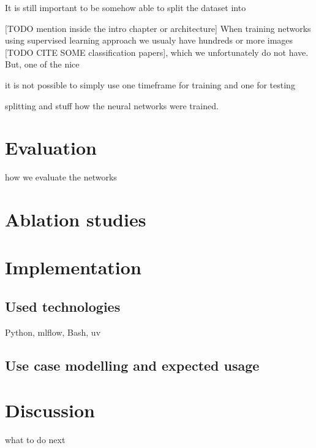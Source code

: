 \documentclass[
  digital,     %
  oneside,     %
  nosansbold,  %
  nocolorbold, %
  lof,         %
  lot,         %
]{fithesis4}
\begin{document}
It is still important to be somehow able to split the dataset into  


[TODO mention inside the intro chapter or architecture]
When training
networks using supervised learning approach we usualy have hundreds or more
images [TODO CITE SOME classification papers], which we unfortunately do not
have. But, one of the nice 

it is not possible to simply use one timeframe for training
and one for testing 

splitting and stuff
how the neural networks were trained.

\chapter{Evaluation}
how we evaluate the networks

\chapter{Ablation studies}

\chapter{Implementation}

\section{Used technologies}
Python, mlflow, Bash, uv

\section{Use case modelling and expected usage}

\chapter{Discussion}
what to do next
\end{document}
